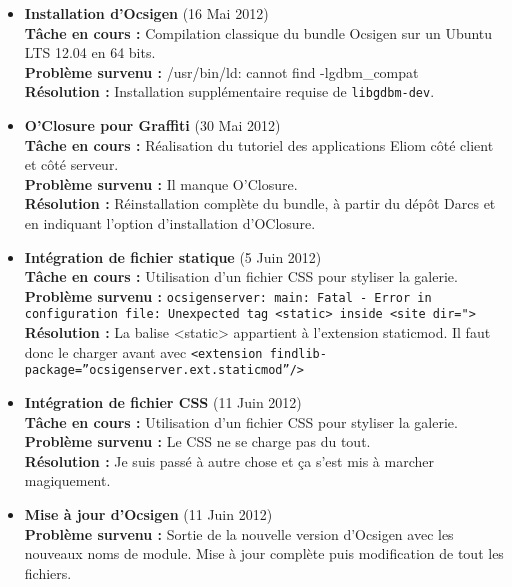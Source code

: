 \documentclass{life-fr}
\begin{document}
\begin{itemize}

  \item \textbf{Installation d'Ocsigen} (16 Mai 2012)\\
    \textbf{Tâche en cours :} Compilation classique du bundle Ocsigen sur un Ubuntu LTS 12.04 en 64 bits.\\
    \textbf{Problème survenu :} /usr/bin/ld: cannot find -lgdbm\_compat\\
    \textbf{Résolution :} Installation supplémentaire requise de \texttt{libgdbm-dev}.

  \item \textbf{O'Closure pour Graffiti} (30 Mai 2012)\\
    \textbf{Tâche en cours :} Réalisation du tutoriel des applications Eliom côté client et côté serveur.\\
    \textbf{Problème survenu :} Il manque O'Closure.\\
    \textbf{Résolution :} Réinstallation complète du bundle, à partir du dépôt Darcs et en indiquant l'option d'installation d'OClosure.

  \item \textbf{Intégration de fichier statique} (5 Juin 2012)\\
    \textbf{Tâche en cours :} Utilisation d'un fichier CSS pour styliser la galerie.\\
    \textbf{Problème survenu :} \texttt{ocsigenserver: main: Fatal - Error in configuration file: Unexpected tag <static> inside <site dir=">}\\
    \textbf{Résolution :} La balise <static> appartient à l'extension staticmod. Il faut donc le charger avant avec \texttt{<extension findlib-package=''ocsigenserver.ext.staticmod''/>}

  \item \textbf{Intégration de fichier CSS} (11 Juin 2012)\\
    \textbf{Tâche en cours :} Utilisation d'un fichier CSS pour styliser la galerie.\\
    \textbf{Problème survenu :} Le CSS ne se charge pas du tout.\\
    \textbf{Résolution :} Je suis passé à autre chose et ça s'est mis à marcher magiquement.

  \item \textbf{Mise à jour d'Ocsigen} (11 Juin 2012)\\
    \textbf{Problème survenu :} Sortie de la nouvelle version d'Ocsigen avec les nouveaux noms de module. Mise à jour complète puis modification de tout les fichiers.


\end{itemize}
\end{document}
